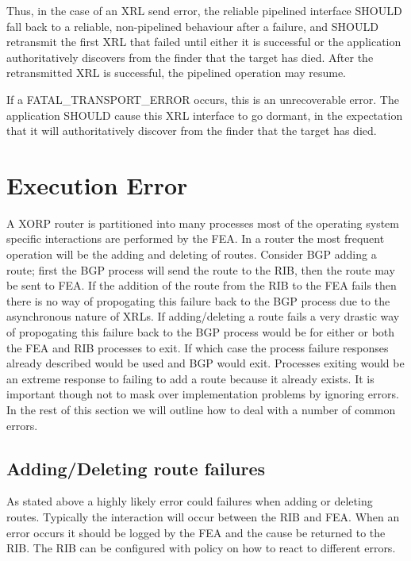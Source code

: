 \documentclass[11pt]{article}
\begin{document}
Thus, in the case of an XRL send error, the reliable pipelined
interface SHOULD fall back to a reliable, non-pipelined behaviour
after a failure, and SHOULD retransmit the first XRL that failed until
either it is successful or the application authoritatively discovers
from the finder that the target has died.  After the retransmitted XRL
is successful, the pipelined operation may resume.

If a FATAL\_TRANSPORT\_ERROR occurs, this is an unrecoverable error.
The application SHOULD cause this XRL interface to go dormant, in the
expectation that it will authoritatively discover from the finder that
the target has died.

\section{Execution Error}

A XORP router is partitioned into many processes most of the operating
system specific interactions are performed by the FEA. In a router the
most frequent operation will be the adding and deleting of routes.
Consider BGP adding a route; first the BGP process will send the route
to the RIB, then the route may be sent to FEA. If the addition of the
route from the RIB to the FEA fails then there is no way of
propogating this failure back to the BGP process due to the
asynchronous nature of XRLs. If adding/deleting a route fails a very
drastic way of propogating this failure back to the BGP process would
be for either or both the FEA and RIB processes to exit. If which case
the process failure responses already described would be used and BGP
would exit. Processes exiting would be an extreme response to failing
to add a route because it already exists. It is important though not
to mask over implementation problems by ignoring errors. In the rest
of this section we will outline how to deal with a number of common
errors.

\subsection{Adding/Deleting route failures}

As stated above a highly likely error could failures when adding or
deleting routes. Typically the interaction will occur between the RIB
and FEA. When an error occurs it should be logged by the FEA and the
cause be returned to the RIB. The RIB can be configured with policy on
how to react to different errors.
\end{document}
